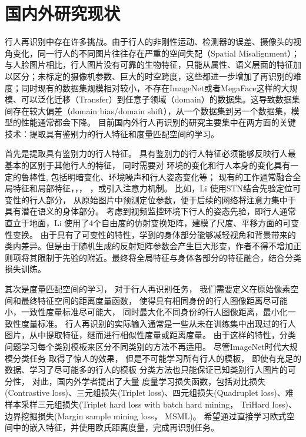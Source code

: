 \section{国内外研究现状}

行人再识别中存在许多挑战。由于行人的非刚性运动、检测器的误差、摄像头的视角变化，同一行人的不同图片往往存在严重的空间失配（Spatial Misalignment）；与人脸图片相比，行人图片没有可靠的生物特征，只能从属性、语义层面的特征加以区分；未标定的摄像机参数、巨大的时空跨度，这些都进一步增加了再识别的难度；同时现有的数据集规模相对较小，不存在ImageNet或者MegaFace这样的大规模、可以泛化迁移（Transfer）到任意子领域（domain）的数据集。这导致数据集间存在较大偏差（domain bias/domain shift），从一个数据集到另一个数据集，模型的性能通常都会下降。
目前国内外行人再识别的研究主要集中在两方面的关键技术：提取具有鉴别力的行人特征和度量匹配空间的学习。

首先是提取具有鉴别力的行人特征。
具有鉴别力的行人特征必须能够反映行人最基本的区别于其他行人的特征，
同时需要对
环境的变化和行人本身的变化具有一定的鲁棒性,
包括明暗变化、环境噪声和行人姿态变化等；
现有的工作通常融合全局特征和局部特征\cite{reciprocal}，\cite{liu2017hydraplus}，\cite{zhao2017spindle}，
\cite{glad}，或引入注意力机制。
比如，Li \etal \cite{latent}使用STN结合先验定位可变性的行人部分，
从原始图片中预测定位参数，便于后续的网络将注意力集中于具有潜在语义的身体部分。
考虑到视频监控环境下行人的姿态先验，即行人通常直立于地面，Li \etal 
使用了4个自由度的仿射变换矩阵，建模了尺度、平移方面的可变性变换。
由于具有了可变性的特性，学到的身体部分能够减轻视角和背景带来的类内差异。但是由于随机生成的反射矩阵参数会产生巨大形变，作者不得不增加正则项将其限制于先验的附近。最终将全局特征与身体各部分的特征融合，结合分类损失训练。


其次是度量匹配空间的学习，
对于行人再识别任务，
我们需要定义在原始像素空间和最终特征空间的距离度量函数，
使得具有相同身份的行人图像距离尽可能小，一致性度量标准尽可能大，
同时最大化不同身份的行人图像距离，最小化一致性度量标准。
行人再识别的实际输入通常是一些从未在训练集中出现过的行人图片，从中提取特征，继而进行相似性度量或距离度量。
由于这样的特性，分类问题学习每个类别模板来区分不同类别的方法不再适用。 
尽管ImageNet时代大规模分类任务\cite{deng2009imagenet}
取得了惊人的效果，
但是不可能学习所有行人的模板，
即使有充足的数据、学习了尽可能多的行人的模板
分类方法也只能保证已知类别行人图片的可分性，
对此，国内外学者提出了大量
度量学习损失函数，包括对比损失(Contrastive loss)\cite{varior2016gated}、三元组损失(Triplet loss)\cite{schroff2015facenet}、四元组损失(Quadruplet loss)\cite{chen2017beyond}、难样本采样三元组损失(Triplet hard loss with batch hard mining， TriHard loss)\cite{hermans2017defense}、边界挖掘损失(Margin sample mining loss， MSML)\cite{xiao2017margin}。
希望通过直接学习欧式空间中的嵌入特征，并使用欧氏距离度量，完成再识别任务。

